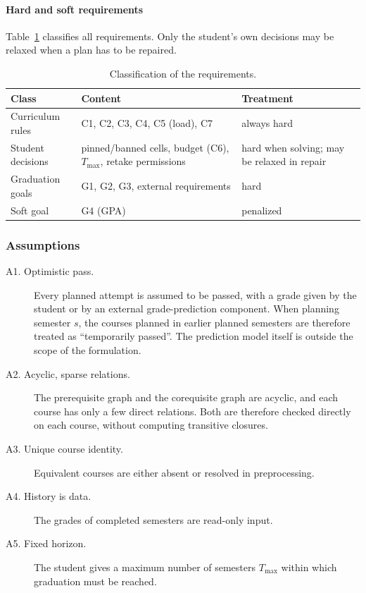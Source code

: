 \paragraph{Hard and soft requirements}
Table~\ref{tab:classes} classifies all requirements. Only the student's own decisions may be relaxed when a plan has to be repaired.

\begin{table}[ht]
\centering
\small
\begin{tabular}{@{}p{3.3cm}p{5.2cm}p{4.6cm}@{}}
\toprule
\textbf{Class} & \textbf{Content} & \textbf{Treatment} \\
\midrule
Curriculum rules & C1, C2, C3, C4, C5 (load), C7 & always hard \\
Student decisions & pinned/banned cells, budget (C6), $T_{\max}$, retake permissions & hard when solving; may be relaxed in repair \\
Graduation goals & G1, G2, G3, external requirements & hard \\
Soft goal & G4 (GPA) & penalized \\
\bottomrule
\end{tabular}
\caption{Classification of the requirements.}
\label{tab:classes}
\end{table}

\subsubsection{Assumptions}

\begin{description}
      \item[A1. Optimistic pass.] Every planned attempt is assumed to be passed, with a grade given by the student or by an external grade-prediction component. When planning semester $s$, the courses planned in earlier planned semesters are therefore treated as ``temporarily passed''. The prediction model itself is outside the scope of the formulation.
      \item[A2. Acyclic, sparse relations.] The prerequisite graph and the corequisite graph are acyclic, and each course has only a few direct relations. Both are therefore checked directly on each course, without computing transitive closures.
      \item[A3. Unique course identity.] Equivalent courses are either absent or resolved in preprocessing.
      \item[A4. History is data.] The grades of completed semesters are read-only input.
      \item[A5. Fixed horizon.] The student gives a maximum number of semesters $T_{\max}$ within which graduation must be reached.
\end{description}

